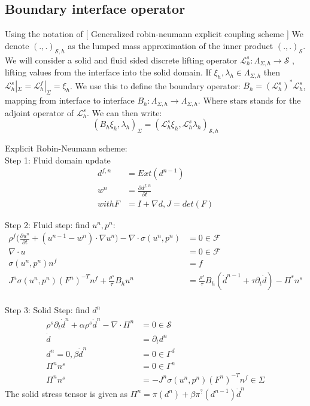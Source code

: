 \subsection*{Boundary interface operator}
Using the notation of [ Generalized robin-neumann explicit coupling scheme ]
We denote $(.,.)_{\mathcal{S},h}$ as the lumped mass approximation of the inner product $(.,.)_{\mathcal{S}}$. We will consider a solid and fluid sided discrete lifting operator $ \mathcal{L}_h^s: \Lambda_{\Sigma, h} \rightarrow \mathcal{S} $ , lifting values from the interface into the solid domain. If $ \xi_h, \lambda_h \in \Lambda_{\Sigma, h}  $ then $\mathcal{L}_h^s |_\Sigma = \mathcal{L}_h^f |_\Sigma = \xi_h  $. We use this to define the boundary operator: $ B_h =(\mathcal{L}_h^s)^* \mathcal{L}_h^s  $, mapping from interface to interface $ B_h : \Lambda_{\Sigma, h} \rightarrow \Lambda_{\Sigma, h}  $.  Where stars stands for the adjoint operator of $ \mathcal{L}_h^s $. We can then write:
$$   ( B_h \xi_h , \lambda_h )_\Sigma = (\mathcal{L}_h^s \xi_h ,\mathcal{L}_h^s \lambda_h)_{\mathcal{S},h} $$


\newpage
Explicit Robin-Neumann scheme: \\
Step 1:
Fluid domain update
\begin{align*}
d^{f,n} &= Ext(d^{n-1}) \\
w^n &= \frac{\partial d^{f,n}}{\partial t} \\
with F &= I + \nabla d, J= det(F)
\end{align*}

Step 2:
Fluid step: find $u^n, p^n$:
\begin{align*}
\rho^f \big( \frac{\partial u^{n}}{\partial t} + ( u^{n-1} - w^n ) \cdot \nabla u^n \big) - \nabla \cdot \sigma(u^n,p^n) &= 0  \in  \mathcal{F} \\
\nabla \cdot u &= 0  \in \mathcal{F} \\
\sigma(u^n, p^n) n^f &= f \\
J^n \sigma(u^n, p^n)(F^n)^{-T}n^f + \frac{\rho^s}{\tau} B_h u^n &= \frac{\rho^s}{\tau} B_h (\dot{d}^{n-1} + \tau \partial_t \dot{d}  ) - \Pi^{*} n^s \\
\end{align*}

Step 3:
Solid Step: find $d^n$
\begin{align*}
\rho^s \partial_t \dot{d}^n + \alpha \rho^s \dot{d}^n - \nabla \cdot \Pi^n &= 0 \in \mathcal{S} \\
\dot{d} &= \partial_t d^n \\
d^n = 0, \beta \dot{d}^n &= 0 \in \Gamma^d  \\
\Pi^n n^s &= 0 \in \Gamma^n \\
\Pi^n n^s &= -J^n \sigma(u^n, p^n) (F^n)^{-T}n^f \in \Sigma 
\end{align*}
The solid stress tensor is given as $ \Pi^n = \pi(d^n) + \beta \pi^{?}(d^{n-1}) \dot{d}^n $

